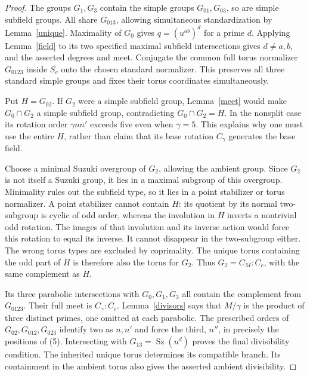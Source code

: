 \documentclass[11pt,a4paper]{article}
\newcommand{\Sz}{\operatorname{Sz}}\newcommand{\F}{\mathbb F}
\begin{document}
\begin{proof}
The groups $G_1,G_3$ contain the simple groups $G_{01},G_{03}$,
so are simple subfield groups. All share $G_{013}$, allowing
simultaneous standardization by Lemma~\ref{unique}. Maximality
of $G_0$ gives $q=(u^{ab})^d$ for a prime $d$. Applying
Lemma~\ref{field} to its two specified maximal subfield
intersections gives $d\ne a,b$, and the asserted degrees and meet.
Conjugate the common full torus normalizer $G_{0123}$ inside $S_e$
onto the chosen standard normalizer. This preserves all three
standard simple groups and fixes their torus coordinates simultaneously.

Put $H=G_{02}$. If $G_2$ were a simple subfield group,
Lemma~\ref{meet} would make $G_0\cap G_2$ a simple subfield
group, contradicting $G_0\cap G_2=H$. In the nonsplit case its
rotation order $\gamma nn'$ exceeds five even when $\gamma=5$.
This explains why one must use the entire $H$, rather than claim
that its base rotation $C_\gamma$ generates the base field.

Choose a minimal Suzuki overgroup of $G_2$, allowing the ambient
group. Since $G_2$ is not itself a Suzuki group, it lies in a
maximal subgroup of this overgroup. Minimality rules out the
subfield type, so it lies in a point stabilizer or torus normalizer.
A point stabilizer cannot contain $H$: its quotient by its normal
two-subgroup is cyclic of odd order, whereas the involution in $H$
inverts a nontrivial odd rotation. The images of that involution
and its inverse action would force this rotation to equal its
inverse. It cannot disappear in the two-subgroup either.
The wrong torus types are excluded by coprimality. The unique
torus containing the odd part of $H$ is therefore also the torus
for $G_2$. Thus $G_2=C_M:C_c$, with the same complement as $H$.

Its three parabolic intersections with $G_0,G_1,G_3$ all contain
the complement from $G_{0123}$. Their full meet is
$C_\gamma:C_c$. Lemma~\ref{divisors} says that $M/\gamma$ is the
product of three distinct primes, one omitted at each parabolic.
The prescribed orders of $G_{02},G_{012},G_{023}$ identify two
as $n,n'$ and force the third, $n''$, in precisely the positions
of (5). Intersecting with $G_{13}=\Sz(u^d)$ proves the final
divisibility condition. The inherited unique torus determines its
compatible branch. Its containment in the ambient torus also
gives the asserted ambient divisibility.
\end{proof}
\end{document}
